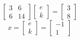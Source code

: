 \documentclass{article}
\begin{document}
\[\begin{bmatrix}3&6\\6&14\end{bmatrix}\begin{bmatrix}e\\k\end{bmatrix}=\begin{bmatrix}3\\8\end{bmatrix}\]
\[x=\begin{bmatrix}e\\k\end{bmatrix}=\begin{bmatrix}-1\\1\end{bmatrix}\]
\end{document}
